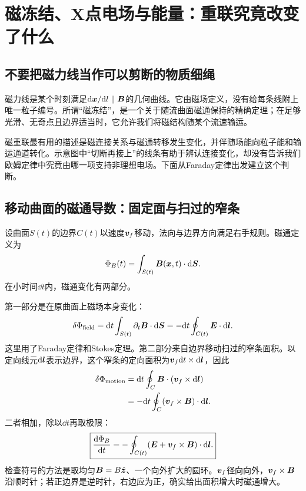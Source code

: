 \chapter{磁冻结、X点电场与能量：重联究竟改变了什么}
\label{hall:ch:freezing}
\section{不要把磁力线当作可以剪断的物质细绳}
磁力线是某个时刻满足$\mathrm d\bm{x}/\mathrm d l\parallel\bm{B}$的几何曲线。它由磁场定义，没有给每条线附上唯一粒子编号。所谓“磁冻结”，是一个关于随流曲面磁通保持的精确定理；在足够光滑、无奇点且边界适当时，它允许我们将磁结构随某个流速输运。

磁重联最有用的描述是磁连接关系与磁通转移发生变化，并伴随场能向粒子能和输运通道转化。示意图中“切断再接上”的线条有助于辨认连接变化，却没有告诉我们欧姆定律中究竟由哪一项支持非理想电场。下面从Faraday定律出发建立这个判断。

\section{移动曲面的磁通导数：固定面与扫过的窄条}
设曲面$S(t)$的边界$C(t)$以速度$\bm{v}_f$移动，法向与边界方向满足右手规则。磁通定义为
\begin{equation}
\Phi_B(t)=\int_{S(t)}\bm{B}(\bm{x},t)\cdot\mathrm d\bm{S}.
\end{equation}
在小时间$\dd t$内，磁通变化有两部分。

第一部分是在原曲面上磁场本身变化：
\begin{equation}
\delta\Phi_{\rm field}=\mathrm d t\int_{S(t)}\partial_t\bm{B}\cdot\mathrm d\bm{S}
=-\mathrm d t\oint_{C(t)}\bm{E}\cdot\mathrm d\bm{l}.
\end{equation}
这里用了Faraday定律和Stokes定理。第二部分来自边界移动扫过的窄条面积。以定向线元$\mathrm d\bm{l}$表示边界，这个窄条的定向面积为$\bm{v}_f\mathrm d t\times\mathrm d\bm{l}$，因此
\begin{align}
\delta\Phi_{\rm motion}
&=\mathrm d t\oint_C\bm{B}\cdot(\bm{v}_f\times\mathrm d\bm{l})\\
&=-\mathrm d t\oint_C(\bm{v}_f\times\bm{B})\cdot\mathrm d\bm{l}.
\end{align}
二者相加，除以$\dd t$再取极限：
\begin{equation}
\boxed{\frac{\mathrm d\Phi_B}{\mathrm d t}
=-\oint_{C(t)}(\bm{E}+\bm{v}_f\times\bm{B})\cdot\mathrm d\bm{l}.}
\label{hall:eq:moving-flux}
\end{equation}
检查符号的方法是取均匀$\bm{B}=B\hat{\bm{z}}$、一个向外扩大的圆环。$\bm{v}_f$径向向外，$\bm{v}_f\times\bm{B}$沿顺时针；若正边界是逆时针，右边应为正，确实给出面积增大时磁通增大。

